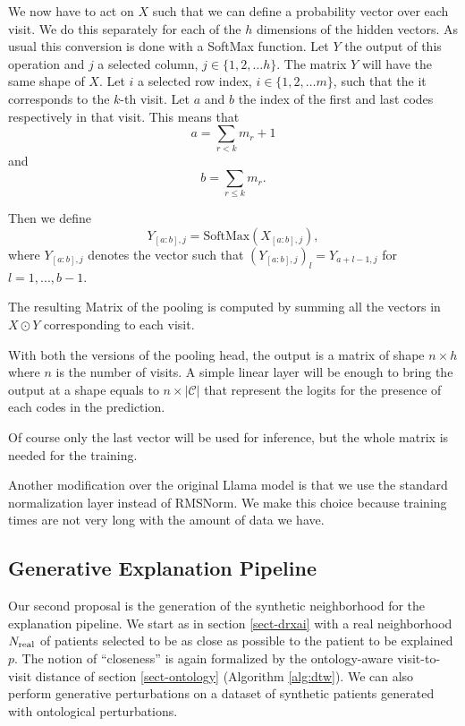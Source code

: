 \documentclass[]{marticle}
\newcommand{\codes}{\mathcal{C}}
\begin{document}
We now have to act on $X$ such that we can define a probability vector over each visit. We do this
separately for each of the $h$ dimensions of the hidden vectors. As usual this conversion is done
with a SoftMax function. Let $Y$ the output of this operation and $j$ a selected column,
$j\in\{1,2,\dots h\}$. The matrix $Y$ will have the same shape of $X$. Let $i$ a selected row index,
$i\in \{1,2,\dots m\}$, such that the it corresponds to the $k$-th visit. Let $a$ and $b$ the index
of the first and last codes respectively in that visit. This means that 
\begin{equation*}
    a = \sum_{r < k} m_r + 1
\end{equation*}
and 
\begin{equation*}
    b = \sum_{r \leq k} m_r.
\end{equation*}

Then we define
\begin{equation*}
   Y_{[a:b], j} = \text{SoftMax}(X_{[a:b], j}),
\end{equation*}
where $Y_{[a:b], j}$ denotes the vector such that $(Y_{[a:b], j})_l = Y_{a+l-1, j}$ for ${{l=1,..., b-1}}$.

The resulting Matrix of the pooling is computed by summing all the vectors in $X\odot Y$
corresponding to each visit.

With both the versions of the pooling head, the output is a matrix of shape $n \times h$ where $n$
is the number of visits. A simple linear layer will be enough to bring the output at a shape equals
to $n \times |\codes|$ that represent the logits for the presence of each codes in the prediction.

Of course only the last vector will be used for inference, but the whole matrix is needed for the
training.

Another modification over the original Llama model is that we use the standard normalization layer
instead of RMSNorm. We make this choice because training times are not very long with the amount of
data we have.


\subsection{Generative Explanation Pipeline}

Our second proposal is the generation of the synthetic neighborhood for the explanation pipeline. We
start as in section \ref{sect-drxai} with a real neighborhood $N_\text{real}$ of patients selected to be
as close as possible to the patient to be explained $p$. The notion of ``closeness'' is again
formalized by the ontology-aware visit-to-visit distance of section \ref{sect-ontology} (Algorithm
\ref{alg:dtw}). We can also perform generative perturbations on a dataset of synthetic patients
generated with ontological perturbations.
\end{document}
